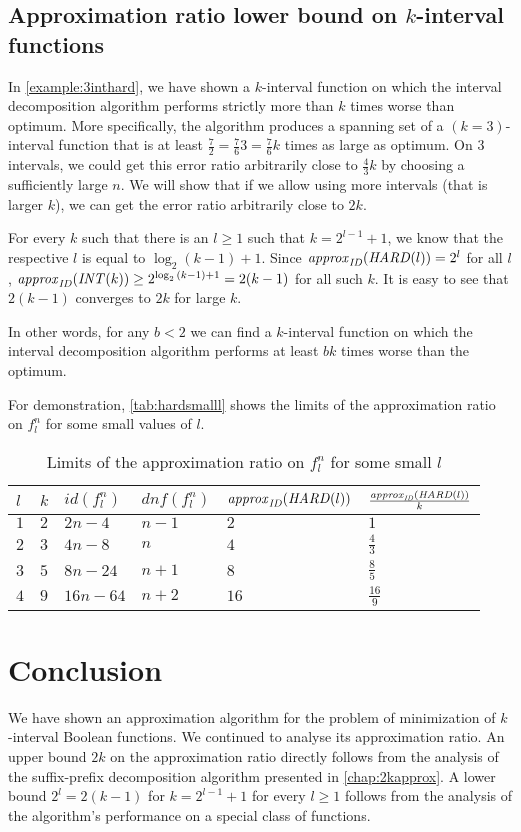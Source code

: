 \subsection{Approximation ratio lower bound on $k$-interval functions}

In \cref{example:3inthard},
we have shown a $k$-interval function
on which the interval decomposition algorithm performs
strictly more than $k$ times worse than optimum.
More specifically,
the algorithm produces a spanning set
of a $(k=3)$-interval function
that is at least
$\frac{7}{2}
= \frac{7}{6} 3
= \frac{7}{6} k$
times as large as optimum.
On $3$ intervals,
we could get this error ratio arbitrarily close
to $\frac{4}{3} k$
by choosing a sufficiently large $n$.
We will show that if we allow using more intervals
(that is larger $k$),
we can get the error ratio arbitrarily close to $2k$.

For every $k$ such that
there is an $l \geq 1$ such that $k = 2^{l-1} + 1$,
we know that the respective $l$
is equal to $\log_2{(k-1)} + 1$.
Since $\mathit{approx}_{\mathit{ID}} (\mathit{HARD}(l)) = 2^l$ for all $l$,
$\mathit{approx}_{\mathit{ID}} (\mathit{INT} (k)) \geq 2^{\log_2{(k-1)} + 1}
= 2(k-1)$
for all such $k$.
It is easy to see that $2(k-1)$ converges to $2k$
for large $k$.

In other words,
for any $b < 2$
we can find a $k$-interval function
on which the interval decomposition algorithm
performs at least $bk$ times worse than the optimum.

For demonstration,
\autoref{tab:hardsmalll} shows the limits
of the approximation ratio on $f_l^n$
for some small values of $l$.

\begin{table}[h]
\centering
\begin{tabular}{l|lllll}
$l$
& $k$ %
& $id(f_l^n)$ %
& $dnf(f_l^n)$ %
& $\mathit{approx}_{\mathit{ID}} (\mathit{HARD}(l))$ %
& $\frac{\mathit{approx}_{\mathit{ID}} (\mathit{HARD}(l))}{k}$
\\
\hline
$1$ & $2$ & $2n-4$ & $n-1$ & $2$ & $1$ \\
$2$ & $3$ & $4n-8$ & $n$ & $4$ & $\frac{4}{3}$ \\
$3$ & $5$ & $8n-24$ & $n+1$ & $8$ & $\frac{8}{5}$ \\
$4$ & $9$ & $16n-64$ & $n+2$ & $16$ & $\frac{16}{9}$
\end{tabular}
\caption{Limits of the approximation ratio
on $f_l^n$
for some small $l$}
\label{tab:hardsmalll}
\end{table}

\section{Conclusion}

We have shown an approximation algorithm for the problem of minimization of $k$-interval Boolean functions.
We continued to analyse its approximation ratio.
An upper bound $2k$ on the approximation ratio
directly follows from the analysis of the suffix-prefix decomposition algorithm presented in \autoref{chap:2kapprox}.
A lower bound $2^l = 2(k-1)$
for $k = 2^{l-1}+1$ for every $l \geq 1$
follows from the analysis of the algorithm's performance
on a special class of  functions.
